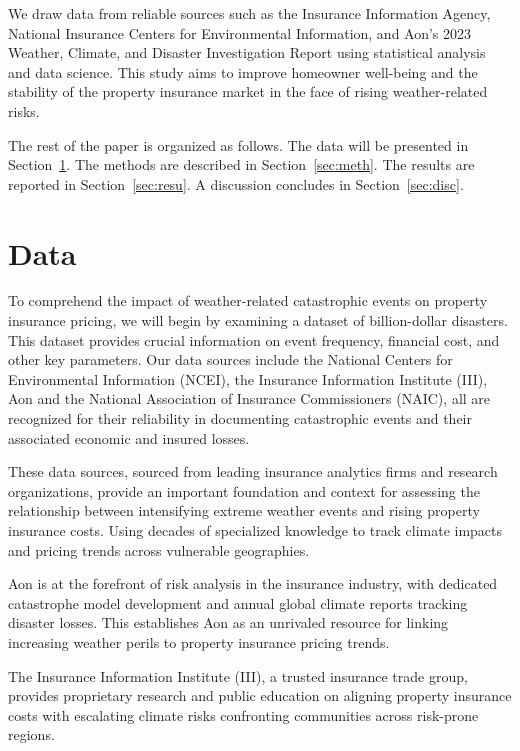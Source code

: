 \documentclass[12pt]{article}
\begin{document}
We draw data from reliable sources such as the Insurance Information Agency, National Insurance Centers for Environmental Information, 
and Aon's 2023 Weather, Climate, and Disaster Investigation Report using statistical analysis and data science. This study aims to 
improve homeowner well-being and the stability of the property insurance market in the face of rising weather-related risks.


The rest of the paper is organized as follows.
The data will be presented in Section~\ref{sec:data}.
The methods are described in Section~\ref{sec:meth}.
The results are reported in Section~\ref{sec:resu}.
A discussion concludes in Section~\ref{sec:disc}.


\section{Data}
\label{sec:data}
To comprehend the impact of weather-related catastrophic events on property insurance pricing, we will begin by examining a dataset of 
billion-dollar disasters. This dataset provides crucial information on event frequency, financial cost, and other key parameters. Our 
data sources include the National Centers for Environmental Information (NCEI)\cite{ncei}, the Insurance Information Institute 
(III)\cite{iii}, Aon\cite{aon} and the National Association of Insurance Commissioners (NAIC)\cite{naic}, all are recognized for their 
reliability in documenting catastrophic events and their associated economic and insured losses.

These data sources, sourced from leading insurance analytics firms and research organizations, provide an important foundation and 
context for assessing the relationship between intensifying extreme weather events and rising property insurance costs. Using decades 
of specialized knowledge to track climate impacts and pricing trends across vulnerable geographies.

Aon is at the forefront of risk analysis in the insurance industry, with dedicated catastrophe model development and annual global 
climate reports tracking disaster losses. This establishes Aon as an unrivaled resource for linking increasing weather perils to 
property insurance pricing trends.

The Insurance Information Institute (III), a trusted insurance trade group, provides proprietary research and public education on aligning 
property insurance costs with escalating climate risks confronting communities across risk-prone regions.
\end{document}
